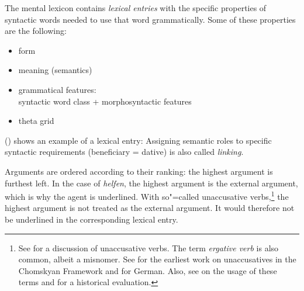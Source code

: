 The mental lexicon contains \emph{lexical entries} with the specific properties of syntactic words needed to use that word grammatically.
Some of these properties are the following:
\begin{itemize}
\item form
\item meaning (semantics)
\item grammatical features:\\
      syntactic word class + morphosyntactic features   
\item theta grid
\end{itemize}

\noindent
() shows an example of a lexical entry:
\ea
{}
\z
Assigning semantic roles to specific syntactic requirements (beneficiary = dative) is also called \emph{linking}.

Arguments are ordered according to their ranking: the highest argument is furthest left. In the case
of \emph{helfen}, the highest argument is the external argument, which is why the agent is underlined. With so"=called unaccusative verbs,\footnote{
See  for a discussion of unaccusative verbs. The term \emph{ergative verb} is also common, albeit
a misnomer. See  for the earliest work on unaccusatives in the Chomskyan Framework and 
 for German. Also, see  on the usage of these terms and for a historical evaluation.
}
the highest argument is not treated as the external argument. It would therefore not be underlined in the corresponding lexical entry.

